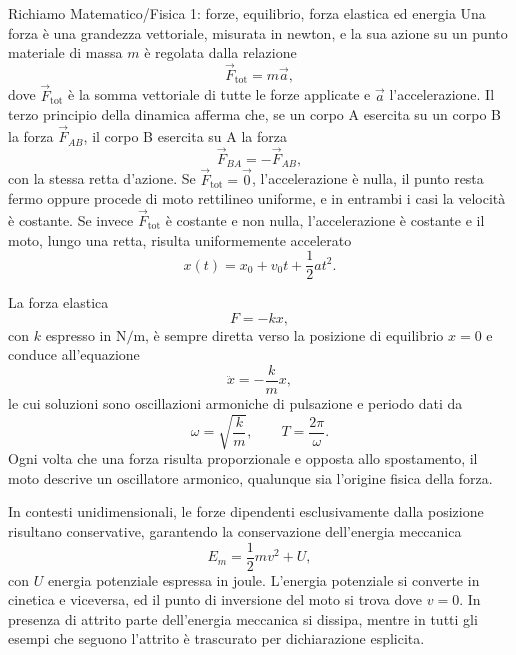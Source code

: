 \documentclass[11pt,a4paper]{article}
\newcommand{\Fv}{\vec{F}}
\newcommand{\titoletto}[1]{\par\Needspace{4\baselineskip}\medskip\noindent{\large\scshape #1}\par\nopagebreak\smallskip\noindent}
\begin{document}
\titoletto{Prerequisiti e strumenti di calcolo}
\begin{richiamo}{Richiamo Matematico/Fisica 1: forze, equilibrio, forza elastica ed energia}
Una forza è una grandezza vettoriale, misurata in newton, e la sua azione su un punto materiale di massa $m$ è regolata dalla relazione
\[
\Fv_{\mathrm{tot}}=m\vec a,
\]
dove $\Fv_{\mathrm{tot}}$ è la somma vettoriale di tutte le forze applicate e $\vec a$ l'accelerazione. Il terzo principio della dinamica afferma che, se un corpo A esercita su un corpo B la forza $\Fv_{AB}$, il corpo B esercita su A la forza
\[
\Fv_{BA}=-\Fv_{AB},
\]
con la stessa retta d'azione. Se $\Fv_{\mathrm{tot}}=\vec 0$, l'accelerazione è nulla, il punto resta fermo oppure procede di moto rettilineo uniforme, e in entrambi i casi la velocità è costante. Se invece $\Fv_{\mathrm{tot}}$ è costante e non nulla, l'accelerazione è costante e il moto, lungo una retta, risulta uniformemente accelerato
\[
x(t)=x_0+v_0t+\frac{1}{2}a t^2.
\]

La forza elastica
\[
F = -kx,
\]
con $k$ espresso in $\mathrm{N/m}$, è sempre diretta verso la posizione di equilibrio $x = 0$ e conduce all'equazione
\[
\ddot{x} = -\frac{k}{m}x,
\]
le cui soluzioni sono oscillazioni armoniche di pulsazione e periodo dati da
\[
\omega = \sqrt{\frac{k}{m}}, \qquad T = \frac{2\pi}{\omega}.
\]
Ogni volta che una forza risulta proporzionale e opposta allo spostamento, il moto descrive un oscillatore armonico, qualunque sia l'origine fisica della forza.

In contesti unidimensionali, le forze dipendenti esclusivamente dalla posizione risultano conservative, garantendo la conservazione dell'energia meccanica
\[
E_m = \frac{1}{2}mv^2 + U,
\]
con $U$ energia potenziale espressa in joule. L'energia potenziale si converte in cinetica e viceversa, ed il punto di inversione del moto si trova dove $v = 0$. In presenza di attrito parte dell'energia meccanica si dissipa, mentre in tutti gli esempi che seguono l'attrito è trascurato per dichiarazione esplicita.
\end{richiamo}
\end{document}
